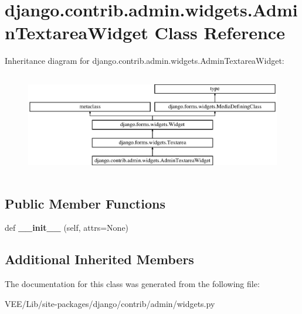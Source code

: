 \hypertarget{classdjango_1_1contrib_1_1admin_1_1widgets_1_1_admin_textarea_widget}{}\section{django.\+contrib.\+admin.\+widgets.\+Admin\+Textarea\+Widget Class Reference}
\label{classdjango_1_1contrib_1_1admin_1_1widgets_1_1_admin_textarea_widget}
Inheritance diagram for django.\+contrib.\+admin.\+widgets.\+Admin\+Textarea\+Widget\+:\begin{figure}[H]
\begin{center}
\leavevmode
\includegraphics[height=4.516129cm]{classdjango_1_1contrib_1_1admin_1_1widgets_1_1_admin_textarea_widget}
\end{center}
\end{figure}
\subsection*{Public Member Functions}
\begin{DoxyCompactItemize}
\item 
\mbox{\label{classdjango_1_1contrib_1_1admin_1_1widgets_1_1_admin_textarea_widget_adba31a34587488e9a13a2c613f4c1841}} 
def {\bfseries \+\_\+\+\_\+init\+\_\+\+\_\+} (self, attrs=None)
\end{DoxyCompactItemize}
\subsection*{Additional Inherited Members}


The documentation for this class was generated from the following file\+:\begin{DoxyCompactItemize}
\item 
V\+E\+E/\+Lib/site-\/packages/django/contrib/admin/widgets.\+py\end{DoxyCompactItemize}

